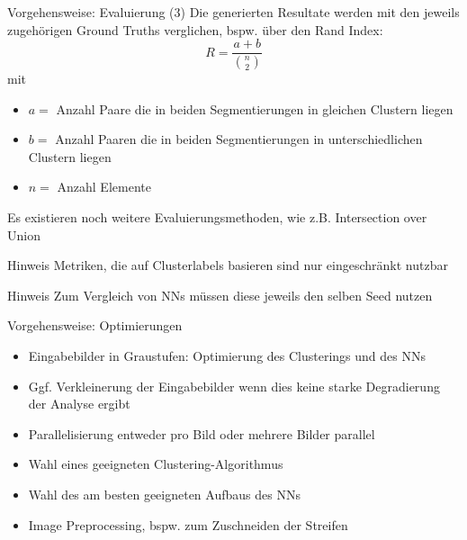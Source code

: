 \documentclass[9pt]{beamer}
\begin{document}
\begin{frame}{Vorgehensweise: Evaluierung (3)}
Die generierten Resultate werden mit den jeweils zugehörigen Ground Truths verglichen, bspw. über den Rand Index:
\[R = \frac{a+b}{\binom{n}{2}}\]
mit
\begin{itemize}
	\item{$a=$} Anzahl Paare die in beiden Segmentierungen in gleichen Clustern liegen
	\item{$b=$} Anzahl Paaren die in beiden Segmentierungen in unterschiedlichen Clustern liegen
	\item{$n=$} Anzahl Elemente
\end{itemize}
\bigskip
Es existieren noch weitere Evaluierungsmethoden, wie z.B. Intersection over Union
\pause
\bigskip
\begin{block}{Hinweis}
	Metriken, die auf Clusterlabels basieren sind nur eingeschränkt nutzbar
\end{block}
\pause
\bigskip
\begin{block}{Hinweis}
	Zum Vergleich von NNs müssen diese jeweils den selben Seed nutzen
\end{block}
\end{frame}

\begin{frame}{Vorgehensweise: Optimierungen}
	\begin{itemize}
		\item Eingabebilder in Graustufen: Optimierung des Clusterings und des NNs
		\item Ggf. Verkleinerung der Eingabebilder wenn dies keine starke Degradierung der Analyse ergibt
		\item Parallelisierung entweder pro Bild oder mehrere Bilder parallel
		\item Wahl eines geeigneten Clustering-Algorithmus
		\item Wahl des am besten geeigneten Aufbaus des NNs
		\item Image Preprocessing, bspw. zum Zuschneiden der Streifen
	\end{itemize}
\end{frame}
\end{document}
